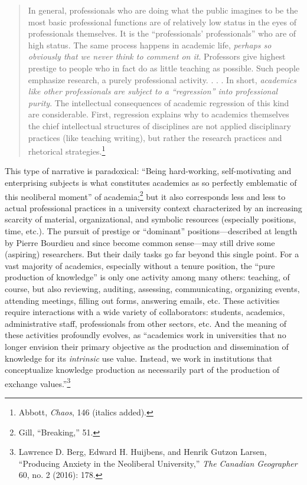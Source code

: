 \documentclass{tufte-handout}
\begin{document}
\begin{quote}
In general, professionals who are doing what the public imagines to be
the most basic professional functions are of relatively low status in
the eyes of professionals themselves. It is the ``professionals'
professionals'' who are of high status. The same process happens in
academic life, \emph{perhaps so obviously that we never think to comment
on it}. Professors give highest prestige to people who in fact do as
little teaching as possible. Such people emphasize research, a purely
professional activity. . . . In short, \emph{academics like other
professionals are subject to a ``regression'' into professional purity}.
The intellectual consequences of academic regression of this kind are
considerable. First, regression explains why to academics themselves the
chief intellectual structures of disciplines are not applied
disciplinary practices (like teaching writing), but rather the research
practices and rhetorical strategies.\footnote{Abbott, \emph{Chaos}, 146
  (italics added).}
\end{quote}

This type of narrative is paradoxical: ``Being hard-working,
self-motivating and enterprising subjects is what constitutes academics
as so perfectly emblematic of this neoliberal moment'' of
academia;\footnote{Gill, ``Breaking,'' 51.} but it also corresponds less
and less to actual professional practices in a university context
characterized by an increasing scarcity of material, organizational, and
symbolic resources (especially positions, time, etc.). The pursuit of
prestige or ``dominant'' positions---described at length by Pierre
Bourdieu and since become common sense---may still drive some (aspiring)
researchers. But their daily tasks go far beyond this single point. For
a vast majority of academics, especially without a tenure position, the
``pure production of knowledge'' is only one activity among many others:
teaching, of course, but also reviewing, auditing, assessing,
communicating, organizing events, attending meetings, filling out forms,
answering emails, etc. These activities require interactions with a wide
variety of collaborators: students, academics, administrative staff,
professionals from other sectors, etc. And the meaning of these
activities profoundly evolves, as ``academics work in universities that
no longer envision their primary objective as the production and
dissemination of knowledge for its \emph{intrinsic} use value. Instead,
we work in institutions that conceptualize knowledge production as
necessarily part of the production of exchange values.''\footnote{Lawrence
  D. Berg, Edward H. Huijbens, and Henrik Gutzon Larsen, ``Producing
  Anxiety in the Neoliberal University,'' \emph{The Canadian Geographer}
  60, no. 2 (2016): 178.}
\end{document}
